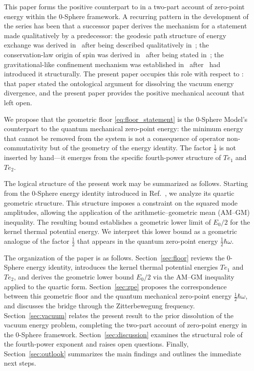 \documentclass[%
 reprint, amsmath,amssymb, aps, prb, ]{revtex4-2}
\numberwithin{equation}{section}
\begin{document}
This paper forms the positive counterpart to \cite{hanamura2026_32} in a two-part account of zero-point energy within the 0-Sphere framework. A recurring pattern in the development of the series has been that a successor paper derives the mechanism for a statement made qualitatively by a predecessor: the geodesic path structure of energy exchange was derived in~\cite{hanamura2024_11} after being described qualitatively in~\cite{hanamura2018}; the conservation-law origin of spin was derived in~\cite{hanamura2025_25} after being stated in~\cite{hanamura2025_20}; the gravitational-like confinement mechanism was established in~\cite{hanamura2026_35} after~\cite{hanamura2026_33} had introduced it structurally. The present paper occupies this role with respect to \cite{hanamura2026_32}: that paper stated the ontological argument for dissolving the vacuum energy divergence, and the present paper provides the positive mechanical account that \cite{hanamura2026_32} left open.

We propose that the geometric floor \eqref{eq:floor_statement} is the 0-Sphere Model's counterpart to the quantum mechanical zero-point energy: the minimum energy that cannot be removed from the system is not a consequence of operator non-commutativity but of the geometry of the energy identity. The factor $\tfrac{1}{2}$ is not inserted by hand---it emerges from the specific fourth-power structure of $Te_1$ and $Te_2$.

The logical structure of the present work may be summarized as follows. Starting from the 0-Sphere energy identity introduced in Ref.~\cite{hanamura2018}, we analyze its quartic geometric structure. This structure imposes a constraint on the squared mode amplitudes, allowing the application of the arithmetic–geometric mean (AM–GM) inequality.  The resulting bound establishes a geometric lower limit of $E_0/2$ for the kernel thermal potential energy. We interpret this lower bound as a geometric analogue of the factor
$\tfrac{1}{2}$ that appears in the quantum zero-point energy $\tfrac{1}{2}\hbar\omega$.

The organization of the paper is as follows. Section~\ref{sec:floor} reviews the 0-Sphere energy identity, introduces the kernel thermal potential energies $Te_1$ and $Te_2$, and derives the geometric lower bound $E_0/2$ via the AM--GM inequality applied to the quartic form. Section~\ref{sec:zpe} proposes the correspondence between this geometric floor and the quantum mechanical zero-point energy $\tfrac{1}{2}\hbar\omega$, and discusses the bridge through the Zitterbewegung frequency. Section~\ref{sec:vacuum} relates the present result to the prior dissolution of the vacuum energy problem, completing the two-part account of zero-point energy in the 0-Sphere framework. Section~\ref{sec:discussion} examines the structural role of the fourth-power exponent and raises open questions. Finally, Section~\ref{sec:outlook} summarizes the main findings and outlines the immediate next steps.
\end{document}
